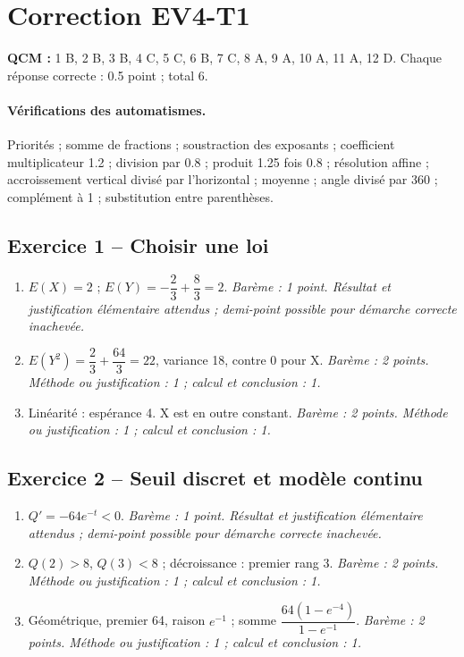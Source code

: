 \mxnewpage\section*{Correction EV4-T1}\label{EV4-T1-CORR}
\textbf{QCM :} 1 B, 2 B, 3 B, 4 C, 5 C, 6 B, 7 C, 8 A, 9 A, 10 A, 11 A, 12 D. Chaque réponse correcte : \num{0,5} point ; total 6.
\paragraph{Vérifications des automatismes.} Priorités ; somme de fractions ; soustraction des exposants ; coefficient multiplicateur \num{1,2} ; division par \num{0,8} ; produit \num{1,25} fois \num{0,8} ; résolution affine ; accroissement vertical divisé par l’horizontal ; moyenne ; angle divisé par 360 ; complément à 1 ; substitution entre parenthèses.
\subsection*{Exercice 1 -- Choisir une loi}
\begin{enumerate}
\item $E(X)=2$ ; $E(Y)=-\dfrac{2}{3}+\dfrac{8}{3}=2$. \textit{Barème : 1 point. Résultat et justification élémentaire attendus ; demi-point possible pour démarche correcte inachevée.}
\item $E(Y^2)=\dfrac{2}{3}+\dfrac{64}{3}=22$, variance 18, contre 0 pour X. \textit{Barème : 2 points. Méthode ou justification : 1 ; calcul et conclusion : 1.}
\item Linéarité : espérance 4. X est en outre constant. \textit{Barème : 2 points. Méthode ou justification : 1 ; calcul et conclusion : 1.}
\end{enumerate}
\subsection*{Exercice 2 -- Seuil discret et modèle continu}
\begin{enumerate}
\item $Q\prime=-64e^{-t}<0$. \textit{Barème : 1 point. Résultat et justification élémentaire attendus ; demi-point possible pour démarche correcte inachevée.}
\item $Q(2)>8$, $Q(3)<8$ ; décroissance : premier rang 3. \textit{Barème : 2 points. Méthode ou justification : 1 ; calcul et conclusion : 1.}
\item Géométrique, premier 64, raison $e^{-1}$ ; somme $\dfrac{64(1-e^{-4})}{1-e^{-1}}$. \textit{Barème : 2 points. Méthode ou justification : 1 ; calcul et conclusion : 1.}
\end{enumerate}
